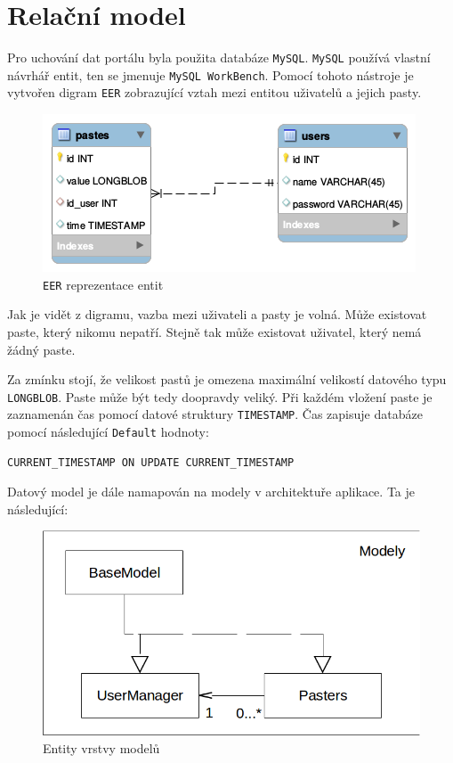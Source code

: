 \documentclass[a4paper,10pt]{report}
\begin{document}
\section{Relační model}

Pro uchování dat portálu byla použita databáze \texttt{MySQL}. \texttt{MySQL} používá vlastní návrhář entit, ten se jmenuje \texttt{MySQL WorkBench}. Pomocí tohoto nástroje je vytvořen digram \texttt{EER} zobrazující vztah mezi entitou uživatelů a jejich pasty.

\begin{figure}[H]
  \centering
	\includegraphics[scale=0.5]{EER.png} 
  \caption{\texttt{EER} reprezentace entit}
  \label{eer}
\end{figure}

Jak je vidět z digramu, vazba mezi uživateli a pasty je volná. Může existovat paste, který nikomu nepatří. Stejně tak může existovat uživatel, který nemá žádný paste.

Za zmínku stojí, že velikost pastů je omezena maximální velikostí datového typu \texttt{LONGBLOB}. Paste může být tedy doopravdy veliký. Při každém vložení paste je zaznamenán čas pomocí datové struktury \texttt{TIMESTAMP}. Čas zapisuje databáze pomocí následující \texttt{Default} hodnoty:

\begin{verbatim}
CURRENT_TIMESTAMP ON UPDATE CURRENT_TIMESTAMP
\end{verbatim}

Datový model je dále namapován na modely v architektuře aplikace. Ta je následující:

\begin{figure}[H]
  \centering
	\includegraphics[scale=0.5]{modely.png} 
  \caption{Entity vrstvy modelů}
  \label{models}
\end{figure}
\end{document}
